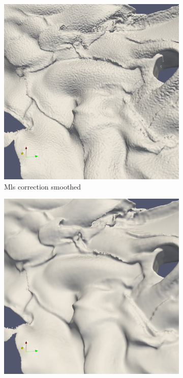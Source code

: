 \begin{figure}
	\begin{center}
		\begin{subfigure}[b]{0.47\textwidth}
			\includegraphics[width=\textwidth]{figures/CanionOriginal3.png}
			\caption{Mls correction smoothed}
		\end{subfigure}
		\begin{subfigure}[b]{0.47\textwidth}
			\includegraphics[width=\textwidth]{figures/CanionMls3.png}

\end{subfigure}
\end{center}
\end{figure}
